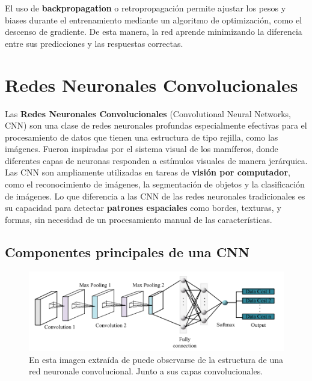 El uso de \textbf{backpropagation} o retropropagación permite ajustar los pesos y biases durante el entrenamiento
mediante un algoritmo de optimización, como el descenso de gradiente.
De esta manera, la red aprende minimizando la diferencia entre sus predicciones y las respuestas correctas.
\section{Redes Neuronales Convolucionales}\label{sec:redes-neuronales-convolucionales}
Las \textbf{Redes Neuronales Convolucionales} (Convolutional Neural Networks, CNN) son una clase de redes neuronales
profundas especialmente efectivas para el procesamiento de datos que tienen una estructura de tipo rejilla, como las
imágenes.
Fueron inspiradas por el sistema visual de los mamíferos, donde diferentes capas de neuronas responden a estímulos
visuales de manera jerárquica. \\[2pt]

Las CNN son ampliamente utilizadas en tareas de \textbf{visión por computador}, como el reconocimiento de imágenes, la
segmentación de objetos y la clasificación de imágenes.
Lo que diferencia a las CNN de las redes neuronales tradicionales es su capacidad para detectar
\textbf{patrones espaciales} como bordes, texturas, y formas, sin necesidad de un procesamiento manual de las
características.


\subsection{Componentes principales de una CNN}\label{subsec:componentes-principales-de-una-cnn}
\begin{figure}[htp] \label{fig:convolution-layer}
    \begin{center}
        \includegraphics[width=1\textwidth]{imagenes/convolution_layer}
    \end{center}
    \caption[Puntos globales y locales]{En esta imagen extraída de
    \cite{zhao_review_2024} puede observarse de la estructura de una red
    neuronale convolucional. Junto a sus capas convolucionales. }
\end{figure}

